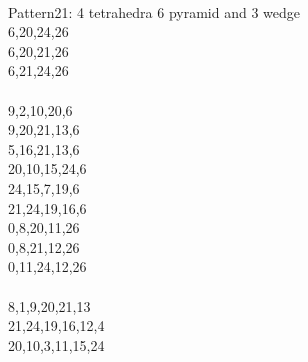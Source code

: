 \documentclass[twocolumn]{article}
\begin{document}
 \\
\tiny  Pattern21: 4 tetrahedra 6 pyramid and 3 wedge\\
\tiny  6,20,24,26 \\
\tiny  6,20,21,26 \\
\tiny  6,21,24,26 \\
\tiny   \\
\tiny  9,2,10,20,6 \\
\tiny  9,20,21,13,6 \\
\tiny  5,16,21,13,6 \\
\tiny  20,10,15,24,6 \\
\tiny  24,15,7,19,6 \\
\tiny  21,24,19,16,6 \\
\tiny  0,8,20,11,26 \\
\tiny  0,8,21,12,26 \\
\tiny  0,11,24,12,26 \\
\tiny   \\
\tiny  8,1,9,20,21,13 \\
\tiny  21,24,19,16,12,4 \\
\tiny  20,10,3,11,15,24 \\
\tiny   \\
\tiny   \\
\end{document}
